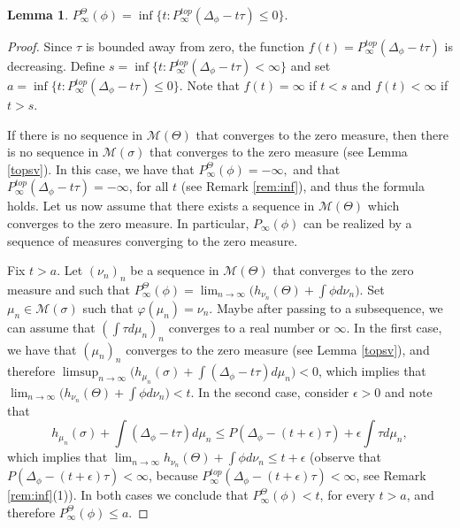\documentclass[letterpaper,11pt]{amsart}
\theoremstyle{plain}
\theoremstyle{plain}
\newtheorem{lemma}[proposition]{Lemma}
\theoremstyle{definition}
\theoremstyle{remark}
\def\M{{\mathcal M}}
\begin{document}
\begin{lemma}\label{lem:formulapara} $P_\infty^\Theta(\phi)=\inf\{t: P^{top}_\infty(\Delta_\phi- t\tau)\le 0\}.$
\end{lemma}
\begin{proof} Since $\tau$ is bounded away from zero, the function $f(t)=P^{top}_\infty(\Delta_\phi- t\tau)$ is decreasing. Define $s=\inf\{t: P^{top}_\infty(\Delta_\phi- t\tau)<\infty\}$ and set $a=\inf\{t: P^{top}_\infty(\Delta_\phi- t\tau)\le 0\}$. Note that $f(t)=\infty$ if $t<s$ and $f(t)<\infty$ if $t>s$. %

If there is no sequence in $\M(\Theta)$ that converges to the zero measure, then there is no sequence in $\M(\sigma)$ that converges to the zero measure (see Lemma \ref{topsv}). In this case, we have that $P_\infty^\Theta(\phi) = -\infty,$ and that $P^{top}_\infty(\Delta_\phi - t\tau) = -\infty$, for all $t$ (see Remark \ref{rem:inf}), and thus the formula holds. Let us now assume that there exists a sequence in $\M(\Theta)$ which converges to the zero measure. In particular, $P_\infty(\phi)$ can be realized by a sequence of measures converging to the zero measure.

Fix $t>a$. Let $(\nu_n)_n$ be a sequence in $\M(\Theta)$ that converges to the zero measure and such that $P_\infty^\Theta(\phi)=\lim_{n\to\infty}\big(h_{\nu_n}(\Theta)+\int \phi d\nu_n\big)$. Set $\mu_n\in \M(\sigma)$ such that $\varphi(\mu_n)=\nu_n$. Maybe after passing to a subsequence, we can assume that $(\int \tau d\mu_n)_n$ converges to a real number or $\infty$. In the first case, we have that $(\mu_n)_n$ converges to the zero measure (see Lemma \ref{topsv}), and therefore $\limsup_{n\to\infty}\big(h_{\mu_n}(\sigma)+\int (\Delta_\phi-t\tau) d\mu_n\big)< 0$, which implies that $\lim_{n\to\infty}\big(h_{\nu_n}(\Theta)+\int \phi d\nu_n\big)< t$. In the second case, consider $\epsilon>0$ and note that $$h_{\mu_n}(\sigma)+\int (\Delta_\phi-t\tau) d\mu_n\le P(\Delta_\phi- (t+\epsilon)\tau)+\epsilon\int \tau d\mu_n,$$ which implies that $\lim_{n\to\infty}h_{\nu_n}(\Theta)+\int \phi d\nu_n\le t+\epsilon$ (observe that $P(\Delta_\phi- (t+\epsilon)\tau)<\infty$,  because $P^{top}_\infty(\Delta_\phi- (t+\epsilon)\tau)<\infty$, see Remark \ref{rem:inf}(1)). In both cases we conclude that $P_\infty^\Theta(\phi)<t$, for every $t>a$, and therefore $P_\infty^\Theta(\phi)\le a$. 


\end{proof}
\end{document}

